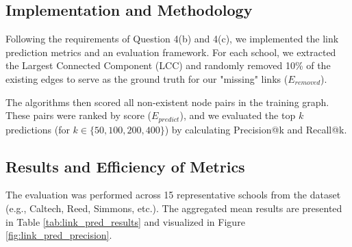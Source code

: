 \documentclass[12pt]{article}
\begin{document}
\subsection{Implementation and Methodology}

Following the requirements of Question 4(b) and 4(c), we implemented the link prediction metrics and an evaluation framework. For each school, we extracted the Largest Connected Component (LCC) and randomly removed 10\% of the existing edges to serve as the ground truth for our "missing" links ($E_{removed}$).

The algorithms then scored all non-existent node pairs in the training graph. These pairs were ranked by score ($E_{predict}$), and we evaluated the top $k$ predictions (for $k \in \{50, 100, 200, 400\}$) by calculating Precision@k and Recall@k.

\subsection{Results and Efficiency of Metrics}

The evaluation was performed across 15 representative schools from the dataset (e.g., Caltech, Reed, Simmons, etc.). The aggregated mean results are presented in Table \ref{tab:link_pred_results} and visualized in Figure \ref{fig:link_pred_precision}.
\end{document}

